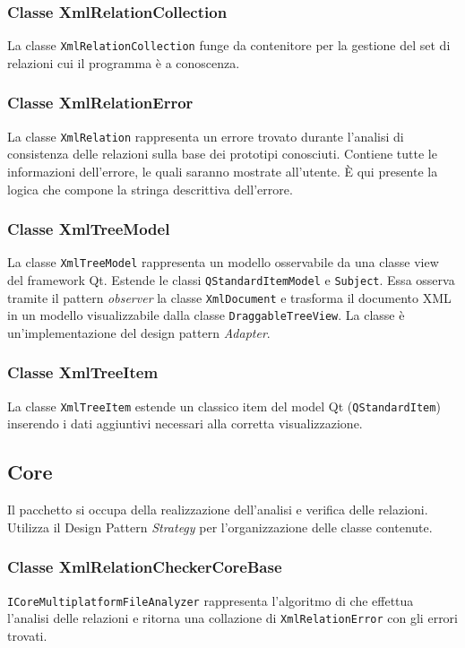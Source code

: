 	\subsubsection{Classe XmlRelationCollection}
		La classe \texttt{XmlRelationCollection} funge da contenitore per la gestione del set di relazioni cui il programma è a conoscenza.

	\subsubsection{Classe XmlRelationError}
		La classe \texttt{XmlRelation} rappresenta un errore trovato durante l'analisi di consistenza delle relazioni sulla base dei prototipi conosciuti. Contiene tutte le informazioni dell'errore, le quali saranno mostrate all'utente. È qui presente la logica che compone la stringa descrittiva dell'errore.
		
	\subsubsection{Classe XmlTreeModel}
		La classe \texttt{XmlTreeModel} rappresenta un modello osservabile da una classe view del framework Qt. Estende le classi \texttt{QStandardItemModel} e \texttt{Subject}. Essa osserva tramite il pattern \textit{observer} la classe \texttt{XmlDocument} e trasforma il documento XML in un modello visualizzabile dalla classe \texttt{DraggableTreeView}. La classe è un'implementazione del design pattern \textit{Adapter}.
		
	\subsubsection{Classe XmlTreeItem}
		La classe \texttt{XmlTreeItem} estende un classico item del model Qt (\texttt{QStandardItem}) inserendo i dati aggiuntivi necessari alla corretta visualizzazione.

\subsection{Core}
	Il pacchetto si occupa della realizzazione dell'analisi e verifica delle relazioni. Utilizza il Design Pattern \textit{Strategy} per l'organizzazione delle classe contenute.

	\subsubsection{Classe XmlRelationCheckerCoreBase}
		\texttt{ICoreMultiplatformFileAnalyzer} rappresenta l'algoritmo di che effettua l'analisi delle relazioni e ritorna una collazione di \texttt{XmlRelationError} con gli errori trovati.
	
